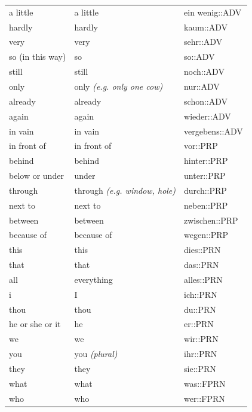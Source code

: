 \begin{center}
\begin{longtable}{lll}
{\sc \lowercase{	A LITTLE	}}	&	a little		&	ein wenig::ADV	\\
{\sc \lowercase{	HARDLY	}}	&	hardly		&	kaum::ADV	\\
{\sc \lowercase{	VERY	}}	&	very		&	sehr::ADV	\\
{\sc \lowercase{	SO \footnotesize (IN THIS WAY)	}}	&	so		&	so::ADV	\\
{\sc \lowercase{	STILL	}}	&	still		&	noch::ADV	\\
{\sc \lowercase{	ONLY	}}	&	only	\textit{\footnotesize (e.g. only one cow)}	&	nur::ADV	\\
{\sc \lowercase{	ALREADY	}}	&	already		&	schon::ADV	\\
{\sc \lowercase{	AGAIN	}}	&	again		&	wieder::ADV	\\
{\sc \lowercase{	IN VAIN	}}	&	in vain		&	vergebens::ADV	\\
{\sc \lowercase{	IN FRONT OF	}}	&	in front of		&	vor::PRP	\\
{\sc \lowercase{	BEHIND	}}	&	behind		&	hinter::PRP	\\
{\sc \lowercase{	BELOW OR UNDER	}}	&	under		&	unter::PRP	\\
{\sc \lowercase{	THROUGH	}}	&	through	\textit{\footnotesize (e.g. window, hole)}	&	durch::PRP	\\
{\sc \lowercase{	NEXT TO	}}	&	next to		&	neben::PRP	\\
{\sc \lowercase{	BETWEEN	}}	&	between		&	zwischen::PRP	\\
{\sc \lowercase{	BECAUSE OF	}}	&	because of		&	wegen::PRP	\\
{\sc \lowercase{	THIS	}}	&	this		&	dies::PRN	\\
{\sc \lowercase{	THAT	}}	&	that		&	das::PRN	\\
{\sc \lowercase{	ALL	}}	&	everything		&	alles::PRN	\\
{\sc \lowercase{	I	}}	&	I		&	ich::PRN	\\
{\sc \lowercase{	THOU	}}	&	thou		&	du::PRN	\\
{\sc \lowercase{	HE OR SHE OR IT	}}	&	he		&	er::PRN	\\
{\sc \lowercase{	WE	}}	&	we		&	wir::PRN	\\
{\sc \lowercase{	YOU	}}	&	you	\textit{\footnotesize (plural)}	&	ihr::PRN	\\
{\sc \lowercase{	THEY	}}	&	they		&	sie::PRN	\\
{\sc \lowercase{	WHAT	}}	&	what		&	was::FPRN	\\
{\sc \lowercase{	WHO	}}	&	who		&	wer::FPRN	\\

\end{longtable}
\end{center}
